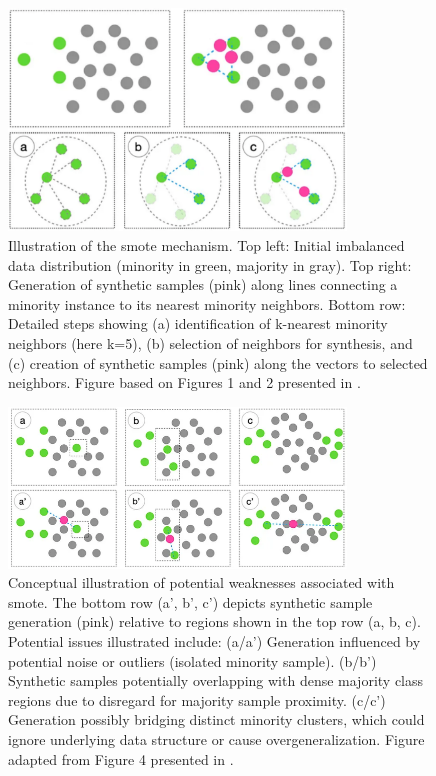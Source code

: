 \documentclass[12pt,a4paper]{report}
\begin{document}
\begin{figure}[htbp]
    \centering
    \includegraphics[width=0.8\textwidth]{images/SMOTE-explained.png}
    \caption[Illustration of the \gls{smote} mechanism]{Illustration of the \gls{smote} mechanism. Top left: Initial imbalanced data distribution (minority in green, majority in gray). Top right: Generation of synthetic samples (pink) along lines connecting a minority instance to its nearest minority neighbors. Bottom row: Detailed steps showing (a) identification of k-nearest minority neighbors (here k=5), (b) selection of neighbors for synthesis, and (c) creation of synthetic samples (pink) along the vectors to selected neighbors. Figure based on Figures 1 and 2 presented in \cite{Truong2022SMOTEVariants}.}
    \label{fig:SMOTE_explained} %
\end{figure}

\begin{figure}[htbp]
    \centering
    \includegraphics[width=0.8\textwidth]{images/SMOTE-weaknesses.png}
    \caption[Illustration of \gls{smote} weaknesses]{Conceptual illustration of potential weaknesses associated with \gls{smote}. The bottom row (a', b', c') depicts synthetic sample generation (pink) relative to regions shown in the top row (a, b, c). Potential issues illustrated include: (a/a') Generation influenced by potential noise or outliers (isolated minority sample). (b/b') Synthetic samples potentially overlapping with dense majority class regions due to disregard for majority sample proximity. (c/c') Generation possibly bridging distinct minority clusters, which could ignore underlying data structure or cause overgeneralization. Figure adapted from Figure 4 presented in \cite{Truong2022SMOTEVariants}.}
    \label{fig:SMOTE_weaknesses} %
\end{figure}
\end{document}
